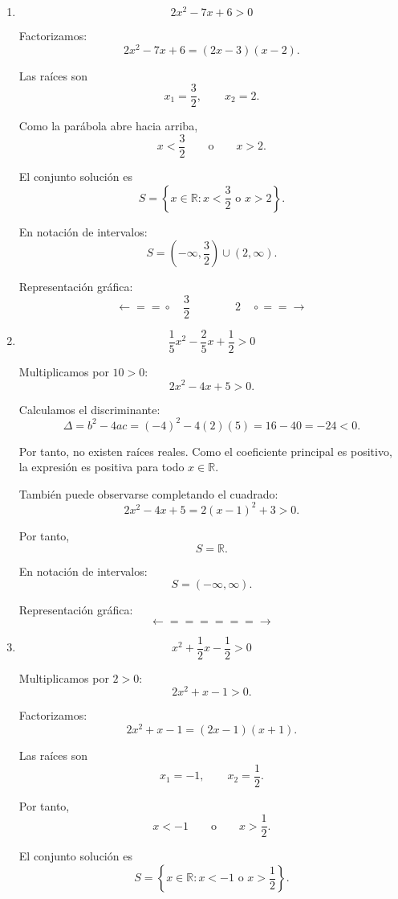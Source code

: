 \documentclass[12pt]{article}
\begin{document}
{\begin{enumerate}
\item
\[
2x^2-7x+6>0
\]

Factorizamos:
\[
2x^2-7x+6=(2x-3)(x-2).
\]

Las raíces son
\[
x_1=\frac{3}{2},
\qquad
x_2=2.
\]

Como la parábola abre hacia arriba,
\[
x<\frac{3}{2}
\qquad \text{o} \qquad
x>2.
\]

El conjunto solución es
\[
\boxed{
S=
\left\{
x\in\mathbb{R}:
x<\frac{3}{2}
\text{ o }
x>2
\right\}.
}
\]

En notación de intervalos:
\[
\boxed{
S=
\left(-\infty,\frac{3}{2}\right)
\cup
(2,\infty).
}
\]

Representación gráfica:
\[
\longleftarrow\!\!=\!\!=\!\circ
\quad \frac{3}{2}
\qquad\qquad
2\quad
\circ\!\!=\!\!=\!\longrightarrow
\]

\item
\[
\frac{1}{5}x^2-\frac{2}{5}x+\frac{1}{2}>0
\]

Multiplicamos por \(10>0\):
\[
2x^2-4x+5>0.
\]

Calculamos el discriminante:
\[
\Delta=b^2-4ac
=(-4)^2-4(2)(5)
=16-40
=-24<0.
\]

Por tanto, no existen raíces reales. Como el coeficiente principal es
positivo, la expresión es positiva para todo \(x\in\mathbb{R}\).

También puede observarse completando el cuadrado:
\[
2x^2-4x+5
=
2(x-1)^2+3>0.
\]

Por tanto,
\[
\boxed{
S=\mathbb{R}.
}
\]

En notación de intervalos:
\[
\boxed{
S=(-\infty,\infty).
}
\]

Representación gráfica:
\[
\longleftarrow\!\!=\!\!=\!\!=\!\!=\!\!=\!\!=\!\longrightarrow
\]

\item
\[
x^2+\frac{1}{2}x-\frac{1}{2}>0
\]

Multiplicamos por \(2>0\):
\[
2x^2+x-1>0.
\]

Factorizamos:
\[
2x^2+x-1=(2x-1)(x+1).
\]

Las raíces son
\[
x_1=-1,
\qquad
x_2=\frac{1}{2}.
\]

Por tanto,
\[
x<-1
\qquad \text{o} \qquad
x>\frac{1}{2}.
\]

El conjunto solución es
\[
\boxed{
S=
\left\{
x\in\mathbb{R}:
x<-1
\text{ o }
x>\frac{1}{2}
\right\}.
}
\]


\end{enumerate}}
\end{document}
